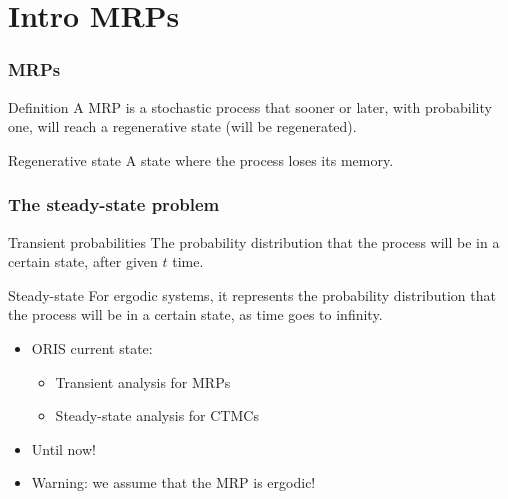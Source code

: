 \begin{frame}[plain]
  \titlepage
\end{frame}

\section{Intro \acfp{MRP}}
\begin{frame}
  \frametitle{\acfp{MRP}}
  \begin{block}{Definition}
    A \acf{MRP} is a stochastic process that sooner or later, with
    probability one, will
    reach a \alert{regenerative} state (will be regenerated).
  \end{block}
  \pause
  \begin{block}{Regenerative state}
    A state where the process loses its memory. 
  \end{block}
  \pause
  \begin{center}    
  \end{center}
\end{frame}

\begin{frame}
  \frametitle{The steady-state problem}
  \pause
  \begin{block}{Transient probabilities}
    The probability distribution that the process will be in a certain
    state, after given $t$ time.
  \end{block}
  \pause
  \begin{block}{Steady-state}
    For ergodic systems, it represents the probability distribution
    that the
    process will be in a certain state, as time goes to infinity.
  \end{block}
  \pause
  \begin{itemize}
  \item ORIS current state:
    \begin{itemize}
    \item Transient analysis for \acfp{MRP}
    \item Steady-state analysis for \acfp{CTMC}
    \end{itemize}
    \pause
  \item Until now! 
    \pause
  \item \alert{Warning:} we assume that the \acs{MRP} is ergodic!
  \end{itemize}
\end{frame}

